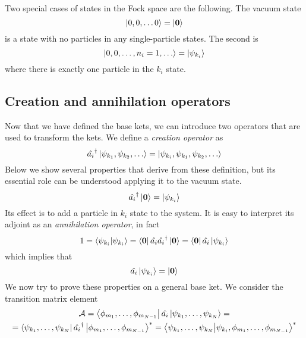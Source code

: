 Two special cases of states in the Fock space are the following. The vacuum state
\begin{equation}
    \ket{0,0,\dots0} = \ket{\mathbf{0}}
\end{equation}
is a state with no particles in any single-particle states. The second is
\begin{equation}
    \ket{0,0,\dots, n_i = 1, \dots} = \ket{\psi_{k_i}}
\end{equation}
where there is exactly one particle in the $k_i$ state.

\subsection{Creation and annihilation operators}
Now that we have defined the base kets, we can introduce two operators that are used to transform the kets. We define a \emph{creation operator} as
\begin{equation} \label{eq:creation_definition}
    \hat{a_i}^\dagger \ket{\psi_{k_1}, \psi_{k_2}, \dots} = \ket{\psi_{k_i},\psi_{k_1}, \psi_{k_2}, \dots}
\end{equation}
Below we show several properties that derive from these definition, but its essential role can be understood applying it to the vacuum state.
\begin{equation}
    \hat{a_i}^\dagger \ket{\mathbf{0}} = \ket{\psi_{k_i}}
\end{equation}
Its effect is to add a particle in $k_i$ state to the system. It is easy to interpret its adjoint as an \emph{annihilation operator}, in fact
\begin{equation}
    1 = \braket{\psi_{k_i}}{\psi_{k_i}} = \bra{\mathbf{0}}\hat{a_i}\hat{a_i}^\dagger\ket{\mathbf{0}} = \bra{\mathbf{0}}\hat{a_i}\ket{\psi_{k_i}}
\end{equation}
which implies that
\begin{equation}
    \hat{a_i}\ket{\psi_{k_i}} = \ket{\mathbf{0}}
\end{equation}
We now try to prove these properties on a general base ket. We consider the transition matrix element
\begin{multline} \label{eq:annihilation_matrix}
    \mathcal{A} =  \bra{\phi_{m_1}, \dots, \phi_{m_{N-1}}} \hat{a_i} \ket{\psi_{k_1}, \dots, \psi_{k_N}} =
    \\ =  \bra{\psi_{k_1}, \dots, \psi_{k_N}} \hat{a_i}^\dagger \ket{\phi_{m_1}, \dots, \phi_{m_{N-1}}}^*
    = \bra{\psi_{k_1}, \dots, \psi_{k_N}} \ket{\psi_{k_i}, \phi_{m_1}, \dots, \phi_{m_{N-1}}}^*
\end{multline}
